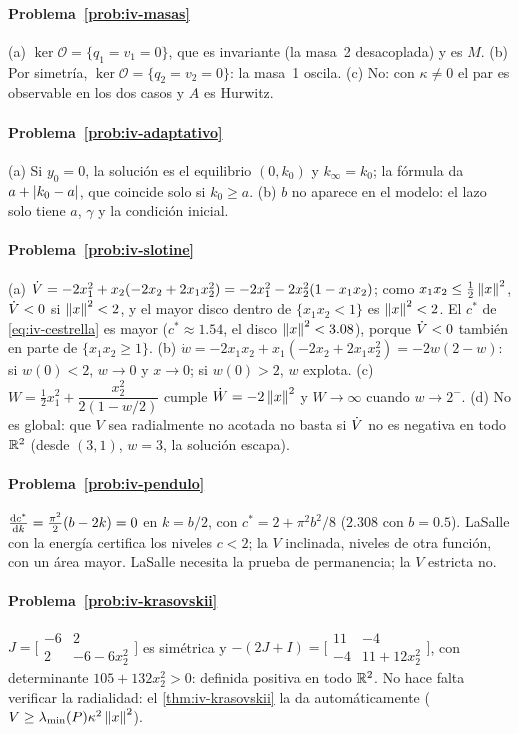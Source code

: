 \paragraph{Problema~\ref{prob:iv-masas}}
(a) $\ker\mathcal O=\{q_1=v_1=0\}$, que es invariante (la masa~2 desacoplada) y es $M$. (b) Por simetría, $\ker\mathcal O=\{q_2=v_2=0\}$: la masa~1 oscila. (c) No: con $\kappa\neq0$ el par es observable en los dos casos y $A$ es Hurwitz.

\paragraph{Problema~\ref{prob:iv-adaptativo}}
(a) Si $y_0=0$, la solución es el equilibrio $(0,k_0)$ y $k_\infty=k_0$; la fórmula da $a+\left\lvert k_0-a\right\rvert$, que coincide solo si $k_0\ge a$. (b) $b$ no aparece en el modelo: el lazo solo tiene $a$, $\gamma$ y la condición inicial.

\paragraph{Problema~\ref{prob:iv-slotine}}
(a) $\dot V=-2x_1^2+x_2(-2x_2+2x_1x_2^2)=-2x_1^2-2x_2^2(1-x_1x_2)$; como $x_1x_2\le\tfrac12\left\lVert x\right\rVert^2$, $\dot V<0$ si $\left\lVert x\right\rVert^2<2$, y el mayor disco dentro de $\{x_1x_2<1\}$ es $\left\lVert x\right\rVert^2<2$. El $c^*$ de \eqref{eq:iv-cestrella} es mayor ($c^*\approx1.54$, el disco $\left\lVert x\right\rVert^2<3.08$), porque $\dot V<0$ también en parte de $\{x_1x_2\ge1\}$. (b) $\dot w=-2x_1x_2+x_1(-2x_2+2x_1x_2^2)=-2w(2-w)$: si $w(0)<2$, $w\to0$ y $x\to0$; si $w(0)>2$, $w$ explota. (c) $W=\tfrac12x_1^2+\dfrac{x_2^2}{2(1-w/2)}$ cumple $\dot W=-2\left\lVert x\right\rVert^2$ y $W\to\infty$ cuando $w\to2^-$. (d) No es global: que $V$ sea radialmente no acotada no basta si $\dot V$ no es negativa en todo $\mathbb{R}^2$ (desde $(3,1)$, $w=3$, la solución escapa).

\paragraph{Problema~\ref{prob:iv-pendulo}}
$\frac{\mathrm{d} c^*}{\mathrm{d} k}=\frac{\pi^2}2(b-2k)=0$ en $k=b/2$, con $c^*=2+\pi^2b^2/8$ ($2.308$ con $b=0.5$). LaSalle con la energía certifica los niveles $c<2$; la $V$ inclinada, niveles de otra función, con un área mayor. LaSalle necesita la prueba de permanencia; la $V$ estricta no.

\paragraph{Problema~\ref{prob:iv-krasovskii}}
$J=\bigl[\begin{smallmatrix}-6&2\\2&-6-6x_2^2\end{smallmatrix}\bigr]$ es simétrica y $-(2J+I)=\bigl[\begin{smallmatrix}11&-4\\-4&11+12x_2^2\end{smallmatrix}\bigr]$, con determinante $105+132x_2^2>0$: definida positiva en todo $\mathbb{R}^2$. No hace falta verificar la radialidad: el \cref{thm:iv-krasovskii} la da automáticamente ($V\ge\lambda_{\min}(P)\kappa^2\left\lVert x\right\rVert^2$).

